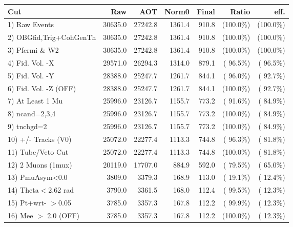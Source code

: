  \begin{table}[h!]\centering
 \begin{tabular}{||l||r|r|r|r|r|r||}
 \hline
 \hline
 Cut & Raw & AOT & Norm0 & Final & Ratio & eff.       \\
 \hline
  1) Raw Events           &      30635.0 &      27242.8 &       1361.4 &        910.8 & (100.0\%) & (100.0\%) \\
  2) OBGfid,Trig+CohGenTh &      30635.0 &      27242.8 &       1361.4 &        910.8 & (100.0\%) & (100.0\%) \\
  3) Pfermi \& W2         &      30635.0 &      27242.8 &       1361.4 &        910.8 & (100.0\%) & (100.0\%) \\
  4) Fid. Vol. -X         &      29571.0 &      26294.3 &       1314.0 &        879.1 & ( 96.5\%) & ( 96.5\%) \\
  5) Fid. Vol. -Y         &      28388.0 &      25247.7 &       1261.7 &        844.1 & ( 96.0\%) & ( 92.7\%) \\
  6) Fid. Vol. -Z (OFF)   &      28388.0 &      25247.7 &       1261.7 &        844.1 & (100.0\%) & ( 92.7\%) \\
  7) At Least 1 Mu        &      25996.0 &      23126.7 &       1155.7 &        773.2 & ( 91.6\%) & ( 84.9\%) \\
  8) ncand=2,3,4          &      25996.0 &      23126.7 &       1155.7 &        773.2 & (100.0\%) & ( 84.9\%) \\
  9) tnchgd=2             &      25996.0 &      23126.7 &       1155.7 &        773.2 & (100.0\%) & ( 84.9\%) \\
 10) +/- Tracks (V0)      &      25072.0 &      22277.4 &       1113.3 &        744.8 & ( 96.3\%) & ( 81.8\%) \\
 11) Tube/Veto Cut        &      25072.0 &      22277.4 &       1113.3 &        744.8 & (100.0\%) & ( 81.8\%) \\
 12) 2 Muons (1mux)       &      20119.0 &      17707.0 &        884.9 &        592.0 & ( 79.5\%) & ( 65.0\%) \\
 13) PmuAsym<0.0          &       3809.0 &       3379.3 &        168.9 &        113.0 & ( 19.1\%) & ( 12.4\%) \\
 14) Theta$<$2.62 rad     &       3790.0 &       3361.5 &        168.0 &        112.4 & ( 99.5\%) & ( 12.3\%) \\
 15) Pt+wrt- $>$0.05      &       3785.0 &       3357.3 &        167.8 &        112.2 & ( 99.9\%) & ( 12.3\%) \\
 16) Mee $>$ 2.0  (OFF)   &       3785.0 &       3357.3 &        167.8 &        112.2 & (100.0\%) & ( 12.3\%) \\

\end{tabular}
\end{table}
